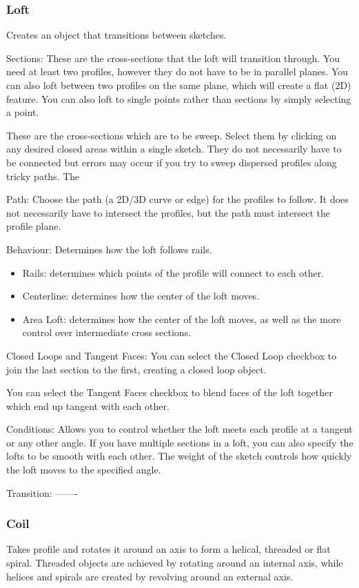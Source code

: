 \subsubsection{Loft}
Creates an object that transitions between sketches.

Sections:
These are the cross-sections that the loft will transition through. You need at least two profiles, however they do not have to be in parallel planes. You can also loft between two profiles on the same plane, which will create a flat (2D) feature. You can also loft to single points rather than sections by simply selecting a point.


These are the cross-sections which are to be sweep. Select them by clicking on any desired closed areas within a single sketch. They do not necessarily have to be connected but errors may occur if you try to sweep dispersed profiles along tricky paths. The

Path:
Choose the path (a 2D/3D curve or edge) for the profiles to follow. It does not necessarily have to intersect the profiles, but the path must intersect the profile plane.

Behaviour:
Determines how the loft follows rails.

\begin{itemize}
    \item Rails: determines which points of the profile will connect to each other.
    \item Centerline: determines how the center of the loft moves.
    \item Area Loft: determines how the center of the loft moves, as well as the more control over intermediate cross sections.
\end{itemize}

Closed Loops and Tangent Faces:
You can select the Closed Loop checkbox to join the last section to the first, creating a closed loop object.

You can select the Tangent Faces checkbox to blend faces of the loft together which end up tangent with each other.

Conditions:
Allows you to control whether the loft meets each profile at a tangent or any other angle. If you have multiple sections in a loft, you can also specify the lofts to be smooth with each other. The weight of the sketch controls how quickly the loft moves to the specified angle.

Transition:
-------

\subsubsection{Coil}
Takes profile and rotates it around an axis to form a helical, threaded or flat spiral. Threaded objects are achieved by rotating around an internal axis, while helices and spirals are created by revolving around an external axis.

